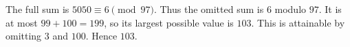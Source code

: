 The full sum is $5050\equiv6\pmod{97}$. Thus the omitted sum is $6$ modulo $97$. It is at most $99+100=199$, so its largest possible value is $103$. This is attainable by omitting $3$ and $100$. Hence $\boxed{103}$.
